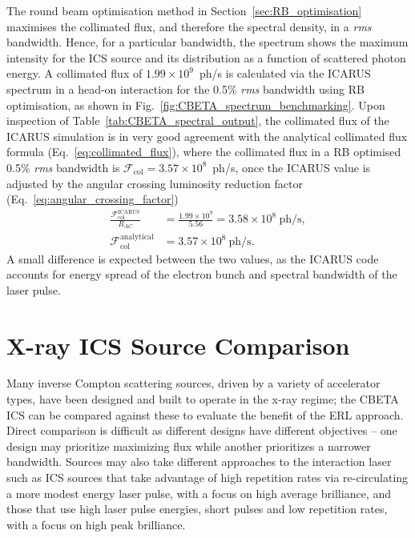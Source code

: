 \documentclass[../main.tex]{subfiles}
\begin{document}
The round beam optimisation method in Section~\ref{sec:RB_optimisation} maximises the collimated flux, and therefore the spectral density, in a \textit{rms} bandwidth. Hence, for a particular bandwidth, the spectrum shows the maximum intensity for the ICS source and its distribution as a function of scattered photon energy. A collimated flux of $1.99\times 10^{9}$~ph/\si{\second} is calculated via the \textsc{ICARUS} spectrum in a head-on interaction for the 0.5\% \textit{rms} bandwidth using RB optimisation, as shown in Fig.~\ref{fig:CBETA_spectrum_benchmarking}. Upon inspection of Table~\ref{tab:CBETA_spectral_output}, the collimated flux of the \textsc{ICARUS} simulation is in very good agreement with the analytical collimated flux formula (Eq.~\ref{eq:collimated_flux}), where the collimated flux in a RB optimised 0.5\% \textit{rms} bandwidth is $\mathcal{F}_{\mathrm{col}} = 3.57\times 10^{8}$~ph/\si{\second}, once the \textsc{ICARUS} value is adjusted by the angular crossing luminosity reduction factor (Eq.~\ref{eq:angular_crossing_factor})
\begin{align*}
\frac{\mathcal{F}_{\mathrm{col}}^{\mathrm{ICARUS}}}{R_{AC}} &= \frac{1.99\times 10^{9}}{5.56} = 3.58\times 10^{8}~\mathrm{ph/\si{\second}}, \\
\mathcal{F}_{\mathrm{col}}^{\mathrm{analytical}} &= 3.57\times 10^{8}~\mathrm{ph/\si{\second}}.
\label{eq:CBETA_ICARUS_yield}    
\end{align*}
A small difference is expected between the two values, as the ICARUS code accounts for energy spread of the electron bunch and spectral bandwidth of the laser pulse.

\section{X-ray ICS Source Comparison}
\label{sec:xray_ICS_comparison}

Many inverse Compton scattering sources, driven by a variety of accelerator types, have been designed and built to operate in the x-ray regime; the CBETA ICS can be compared against these to evaluate the benefit of the ERL approach. Direct comparison is difficult as different designs have different objectives -- one design may prioritize maximizing flux while another prioritizes a narrower bandwidth. Sources may also take different approaches to the interaction laser such as ICS sources that take advantage of high repetition rates via re-circulating a more modest energy laser pulse, with a focus on high average brilliance, and those that use high laser pulse energies, short pulses and low repetition rates, with a focus on high peak brilliance.  
\end{document}
